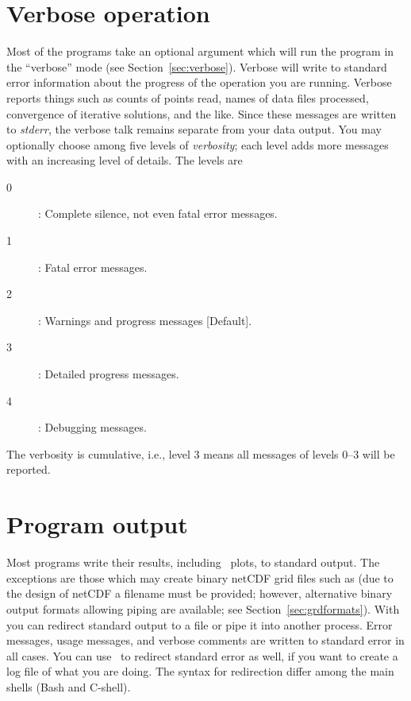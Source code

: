 \section{Verbose operation}

Most of the programs take an optional  argument
which will run the program in the ``verbose'' mode (see Section~\ref{sec:verbose}).
Verbose will write to standard error information about the progress
of the operation you are running.  Verbose reports things
such as counts of points read, names of data files
processed, convergence of iterative solutions, and the like.
Since these messages are written to \emph{stderr},  the
verbose talk remains separate from your data output. 
You may optionally choose among five levels of \emph{verbosity}; each level
adds more messages with an increasing level of details.  The levels are
\begin{description}
	\item [0]: Complete silence, not even fatal error messages.
	\item [1]: Fatal error messages.
	\item [2]: Warnings and progress messages [Default].
	\item [3]: Detailed progress messages.
	\item [4]: Debugging messages.
\end{description}
The verbosity is cumulative, i.e., level 3 means all messages of levels 0--3
will be reported.

\section{Program output}

Most programs write their results, including \PS\
plots, to standard output.  The exceptions are those which may
create binary netCDF grid files such as  (due to
the design of netCDF a filename must be provided; however,
alternative binary output formats allowing piping are available; see Section~\ref{sec:grdformats}).
With \UNIX\, you can redirect standard output to a file or pipe it
into another process.  Error messages, usage messages, and
verbose comments are written to standard error in all cases.
You can use \UNIX\ to redirect standard error as well,
if you want to create a log file of what you are doing.
The syntax for redirection differ among the main shells (Bash and C-shell).

